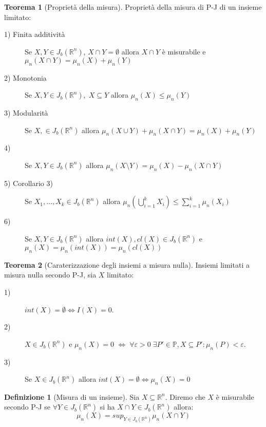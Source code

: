 \documentclass[leqno]{article}
\theoremstyle{definition}
\newtheorem{definition}{Definizione}[section]
\numberwithin{equation}{section}
\newtheorem{theorem}{Teorema}[section]
\theoremstyle{remark}
\begin{document}
	\begin{theorem}[Proprietà della misura]
		Proprietà della misura di P-J di un insieme limitato:
		\begin{description}
			\item[1) Finita additività] Se $X,Y\in J_b(\mathbb{R}^n)$, $X\cap Y = \emptyset$ allora $X\cap Y$ è misurabile e $\mu_n(X\cap Y)=\mu_n(X)+\mu_n(Y)$
			\item[2) Monotonia] Se $X,Y\in J_b(\mathbb{R}^n), \; X \subseteq Y$ allora $\mu_n(X)\le\mu_n(Y)$
			\item[3) Modularità] Se $X,\in J_b(\mathbb{R}^n)$ allora $\mu_n(X\cup Y)+\mu_n(X\cap Y)=\mu_n(X)+\mu_n(Y)$
			\item [4)] Se $X,Y\in J_b(\mathbb{R}^n)$ allora $\mu_n(X \setminus Y)=\mu_n(X)-\mu_n(X\cap Y)$
			\item [5) Corollario 3) ] Se $X_1,\dots, X_k \in J_b(\mathbb{R}^n)$ allora $\mu_n \left(\bigcup_{i=1}^k X_i\right)\le \sum_{i=1}^k \mu_n(X_i) $
			\item[6) ] Se $X,Y\in J_b(\mathbb{R}^n)$ allora $int(X),cl(X)\in J_b(\mathbb{R}^n)$ e $\mu_n(X)=\mu_n(int(X))=\mu_n(cl(X))$
		\end{description}
	\end{theorem}
	\begin{theorem}[Caraterizzazione degli insiemi a misura nulla]
		Insiemi limitati a misura nulla secondo P-J, sia $X$ limitato:
		\begin{description}
			\item[1)] $int(X)=\emptyset \Leftrightarrow I(X)=0$.
			\item[2)] $X\in J_b(\mathbb{R}^n)$ e $\mu_n(X)=0$ $\Leftrightarrow \; \forall \varepsilon > 0 \; \exists P'\in \mathbb{P}, X \subseteq P' : \mu_n(P)<\varepsilon$. 
			\item[3)] Se $X \in J_b(\mathbb{R}^n)$ allora $int(X)=\emptyset \Leftrightarrow \mu_n(X)=0$
		\end{description}
	\end{theorem}
	
	\begin{definition}[Misura di un insieme]
		Sia $X\subseteq \mathbb{R}^n$. Diremo che $X$ è misurabile secondo P-J se $\forall Y \in J_b(\mathbb{R}^n)$ si ha $X \cap Y \in J_b(\mathbb{R}^n)$ allora:
		\begin{equation}
			\mu_n(X)=sup_{Y \in J_b(\mathbb{R}^n)}\mu_n(X \cap Y)
		\end{equation}
	\end{definition}
	
\end{document}
